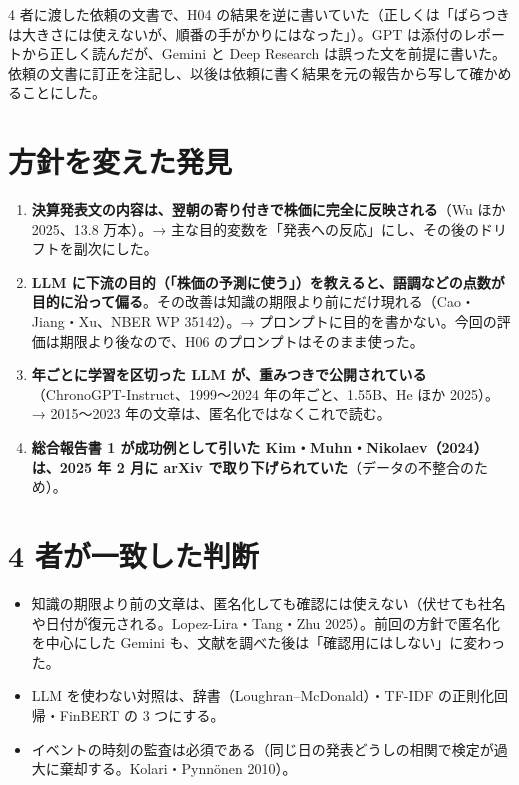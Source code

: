 \documentclass[xelatex,ja=standard,jafont=haranoaji,a4paper,10pt]{bxjsreport}
\begin{document}
\begin{notebox}[依頼の文書の誤り]
4 者に渡した依頼の文書で、H04 の結果を逆に書いていた（正しくは「ばらつきは大きさには使えないが、順番の手がかりにはなった」）。GPT は添付のレポートから正しく読んだが、Gemini と Deep Research は誤った文を前提に書いた。依頼の文書に訂正を注記し、以後は依頼に書く結果を元の報告から写して確かめることにした。
\end{notebox}

\section{方針を変えた発見}

\begin{enumerate}
\item \textbf{決算発表文の内容は、翌朝の寄り付きで株価に完全に反映される}（Wu ほか 2025、13.8 万本）。→ 主な目的変数を「発表への反応」にし、その後のドリフトを副次にした。
\item \textbf{LLM に下流の目的（「株価の予測に使う」）を教えると、語調などの点数が目的に沿って偏る}。その改善は知識の期限より前にだけ現れる（Cao・Jiang・Xu、NBER WP 35142）。→ プロンプトに目的を書かない。今回の評価は期限より後なので、H06 のプロンプトはそのまま使った。
\item \textbf{年ごとに学習を区切った LLM が、重みつきで公開されている}（ChronoGPT-Instruct、1999〜2024 年の年ごと、1.55B、He ほか 2025）。→ 2015〜2023 年の文章は、匿名化ではなくこれで読む。
\item \textbf{総合報告書 1 が成功例として引いた Kim・Muhn・Nikolaev（2024）は、2025 年 2 月に arXiv で取り下げられていた}（データの不整合のため）。
\end{enumerate}

\section{4 者が一致した判断}

\begin{itemize}
\item 知識の期限より前の文章は、匿名化しても確認には使えない（伏せても社名や日付が復元される。Lopez-Lira・Tang・Zhu 2025）。前回の方針で匿名化を中心にした Gemini も、文献を調べた後は「確認用にはしない」に変わった。
\item LLM を使わない対照は、辞書（Loughran--McDonald）・TF-IDF の正則化回帰・FinBERT の 3 つにする。
\item イベントの時刻の監査は必須である（同じ日の発表どうしの相関で検定が過大に棄却する。Kolari・Pynnönen 2010）。
\end{itemize}
\end{document}
